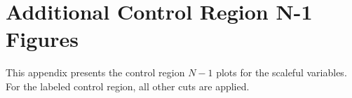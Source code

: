 

\chapter{Additional Control Region N-1 Figures}
\label{app:cr_n-1_plots}

This appendix presents the control region $N-1$ plots for the scaleful variables.
For the labeled control region, all other cuts are applied.


